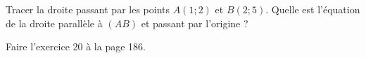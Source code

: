 
\begin{exercice}\label{exosmath-0616}

    Tracer la droite passant par les points \( A(1;2)\) et \( B(2;5)\). Quelle est l'équation de la droite parallèle à \( (AB)\) et passant par l'origine ?

    Faire l'exercice 20 à la page 186.

\end{exercice}
